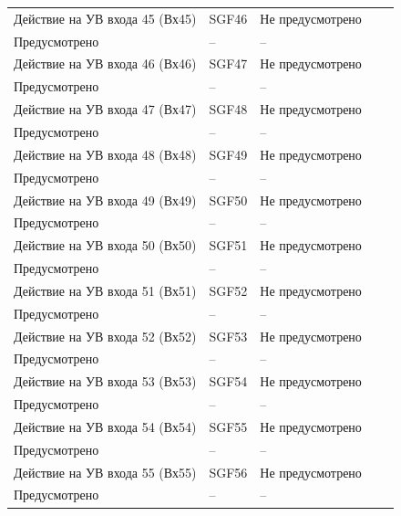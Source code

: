 \begin{longtable}{|>{\centering\arraybackslash}m{5.3cm}|>{\centering\arraybackslash}m{3.3cm}|>{\centering\arraybackslash}m{4.2cm}|>{\centering\arraybackslash}m{1.8cm}|>{\centering\arraybackslash}m{1cm}|}
\hline
\centering Действие на УВ входа 45 (Вх45)  & \centering SGF46 & \centering Не предусмотрено \\ Предусмотрено & \centering -- & \centering \arraybackslash -- \\
\hline
\centering Действие на УВ входа 46 (Вх46)  & \centering SGF47 & \centering Не предусмотрено \\ Предусмотрено & \centering -- & \centering \arraybackslash -- \\
\hline
\centering Действие на УВ входа 47 (Вх47)  & \centering SGF48 & \centering Не предусмотрено \\ Предусмотрено & \centering -- & \centering \arraybackslash -- \\
\hline
\centering Действие на УВ входа 48 (Вх48)  & \centering SGF49 & \centering Не предусмотрено \\ Предусмотрено & \centering -- & \centering \arraybackslash -- \\
\hline
\centering Действие на УВ входа 49 (Вх49)  & \centering SGF50 & \centering Не предусмотрено \\ Предусмотрено & \centering -- & \centering \arraybackslash -- \\
\hline
\centering Действие на УВ входа 50 (Вх50)  & \centering SGF51 & \centering Не предусмотрено \\ Предусмотрено & \centering -- & \centering \arraybackslash -- \\
\hline
\centering Действие на УВ входа 51 (Вх51)  & \centering SGF52 & \centering Не предусмотрено \\ Предусмотрено & \centering -- & \centering \arraybackslash -- \\
\hline
\centering Действие на УВ входа 52 (Вх52)  & \centering SGF53 & \centering Не предусмотрено \\ Предусмотрено & \centering -- & \centering \arraybackslash -- \\
\hline
\centering Действие на УВ входа 53 (Вх53)  & \centering SGF54 & \centering Не предусмотрено \\ Предусмотрено & \centering -- & \centering \arraybackslash -- \\
\hline
\centering Действие на УВ входа 54 (Вх54)  & \centering SGF55 & \centering Не предусмотрено \\ Предусмотрено & \centering -- & \centering \arraybackslash -- \\
\hline
\centering Действие на УВ входа 55 (Вх55)  & \centering SGF56 & \centering Не предусмотрено \\ Предусмотрено & \centering -- & \centering \arraybackslash -- \\

\end{longtable}
